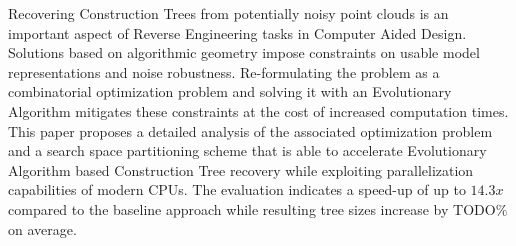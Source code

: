 Recovering Construction Trees from potentially noisy point clouds is an important aspect of Reverse Engineering tasks in Computer Aided Design. 
Solutions based on algorithmic geometry impose constraints on usable model representations and noise robustness. 
Re-formulating the problem as a combinatorial optimization problem and solving it with an Evolutionary Algorithm mitigates these constraints at the cost of increased computation times. 
This paper proposes a detailed analysis of the associated optimization problem and a search space partitioning scheme that is able to accelerate Evolutionary Algorithm based Construction Tree recovery while exploiting parallelization capabilities of modern CPUs.
The evaluation indicates a speed-up of up to $14.3x$ compared to the baseline approach while resulting tree sizes increase by TODO$\%$ on average.    
